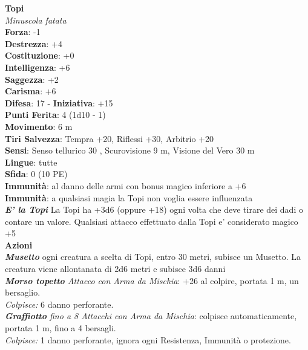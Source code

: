 \begin{multicols}{2}
\medskip\textbf{Topi}\\
\emph{Minuscola fatata}\\
\textbf{Forza}: -1\\
\textbf{Destrezza}: +4\\
\textbf{Costituzione}: +0\\
\textbf{Intelligenza}: +6\\
\textbf{Saggezza}: +2\\
\textbf{Carisma}: +6\\
\textbf{Difesa}: 17 - \textbf{Iniziativa}: +15\\
\textbf{Punti Ferita}: 4 (1d10 - 1)\\
\textbf{Movimento}: 6 m\\
\textbf{Tiri Salvezza}: Tempra +20, Riflessi +30, Arbitrio +20 \\
\textbf{Sensi}: Senso tellurico 30 , Scurovisione 9 m, Visione del Vero 30 m\\
\textbf{Lingue}: tutte\\
\textbf{Sfida}: 0 (10 PE)\smallskip\\
\textbf{Immunità}: al danno delle armi con bonus magico inferiore a +6\\
\textbf{Immunità}: a qualsiasi magia la Topi non voglia essere influenzata\\
\emph{\textbf{E' la Topi}} La Topi ha +3d6 (oppure +18) ogni volta che deve tirare dei dadi o contare un valore. Qualsiasi attacco effettuato dalla Topi e' considerato magico +5\\
\smallskip\textbf{Azioni}\\
\emph{\textbf{Musetto}} ogni creatura a scelta di Topi, entro 30 metri, subisce un Musetto. La creatura viene allontanata di 2d6 metri e subisce 3d6 danni\\
\emph{\textbf{Morso topetto} Attacco con Arma da Mischia}: +26 al colpire, portata 1 m, un bersaglio.\\
\emph{Colpisce:} 6 danno perforante.\\
\emph{\textbf{Graffiotto} fino a 8 Attacchi con Arma da Mischia}: colpisce automaticamente, portata 1 m, fino a 4 bersagli.\\
\emph{Colpisce:} 1 danno perforante, ignora ogni Resistenza, Immunità o protezione.\\



\end{multicols}
